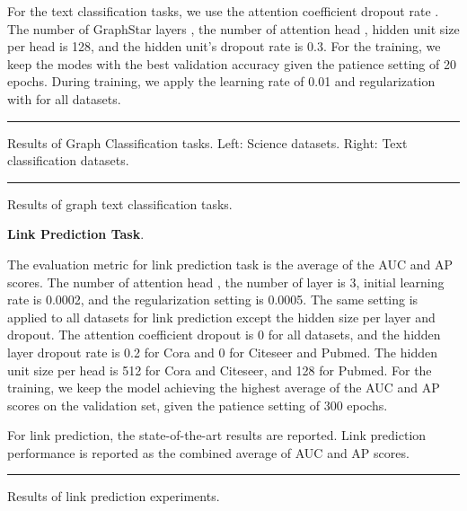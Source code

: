\documentclass{article}
\begin{document}
For the text classification tasks, we use the attention coefficient dropout rate . The number of GraphStar layers , the number of attention head , hidden unit size per head is 128, and the hidden unit's dropout rate is 0.3. For the training, we keep the modes with the best validation accuracy given the patience setting of 20 epochs. During training, we apply the learning rate of 0.01 and  regularization with  for all datasets. 

\begin{table}[!ht]
\centering
{}
\rule{\linewidth}{0cm}
\caption{\label{Table3:Graph Classification} Results of Graph Classification tasks. Left: Science datasets. Right: Text classification datasets.}
\end{table}
\begin{table}[!ht]
\centering
{}
\rule{\linewidth}{0cm}
\caption{\label{Table4:Graph Classification Text} Results of graph text classification tasks.}
\end{table}
\vspace*{-\baselineskip}

\textbf{Link Prediction Task}. 

The evaluation metric for link prediction task is the average of the AUC and AP scores. The number of attention head , the number of layer is 3, initial learning rate is 0.0002, and the  regularization setting is 0.0005. The same setting is applied to all datasets for link prediction except the hidden size per layer and dropout. The attention coefficient dropout is 0 for all datasets, and the hidden layer dropout rate is 0.2 for Cora and 0 for Citeseer and Pubmed. The hidden unit size per head is 512 for Cora and Citeseer, and 128 for Pubmed. For the training, we keep the model achieving the highest average of the AUC and AP scores on the validation set, given the patience setting of 300 epochs. 

For link prediction, the \cite{kipf2016semi, DBLP:journals/corr/abs-1811-02798} state-of-the-art results are reported. Link prediction performance is reported as the combined average of AUC and AP scores.

\begin{table}[!ht]
\centering
{}
\rule{\linewidth}{0cm}
\caption{\label{Table5:Link Prediction} Results of link prediction experiments.}
\end{table}
\end{document}
